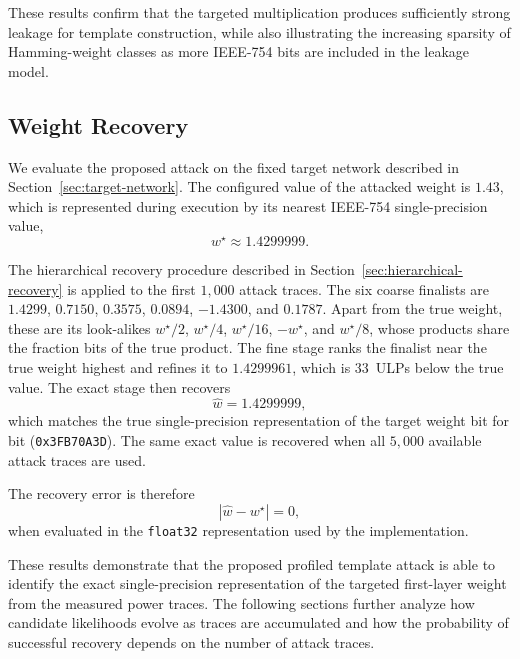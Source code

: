 \documentclass[conference]{IEEEtran}
\begin{document}
These results confirm that the targeted multiplication produces sufficiently strong leakage for template construction, while also illustrating the increasing sparsity of Hamming-weight classes as more IEEE-754 bits are included in the leakage model.

\subsection{Weight Recovery}
\label{sec:weight-recovery}

We evaluate the proposed attack on the fixed target network described in Section~\ref{sec:target-network}.
The configured value of the attacked weight is $1.43$, which is represented during execution by its nearest IEEE-754 single-precision value,
\begin{equation*}
	w^\star \approx 1.4299999.
\end{equation*}

The hierarchical recovery procedure described in Section~\ref{sec:hierarchical-recovery} is applied to the first $1{,}000$ attack traces.
The six coarse finalists are $1.4299$, $0.7150$, $0.3575$, $0.0894$, $-1.4300$, and $0.1787$.
Apart from the true weight, these are its look-alikes $w^\star/2$, $w^\star/4$, $w^\star/16$, $-w^\star$, and $w^\star/8$, whose products share the fraction bits of the true product.
The fine stage ranks the finalist near the true weight highest and refines it to $1.4299961$, which is $33$~ULPs below the true value.
The exact stage then recovers
\begin{equation*}
	\hat{w} = 1.4299999,
\end{equation*}
which matches the true single-precision representation of the target weight bit for bit (\texttt{0x3FB70A3D}).
The same exact value is recovered when all $5{,}000$ available attack traces are used.

The recovery error is therefore
\begin{equation*}
	|\hat{w} - w^\star| = 0,
\end{equation*}
when evaluated in the \texttt{float32} representation used by the implementation.

These results demonstrate that the proposed profiled template attack is able to identify the exact single-precision representation of the targeted first-layer weight from the measured power traces.
The following sections further analyze how candidate likelihoods evolve as traces are accumulated and how the probability of successful recovery depends on the number of attack traces.
\end{document}
